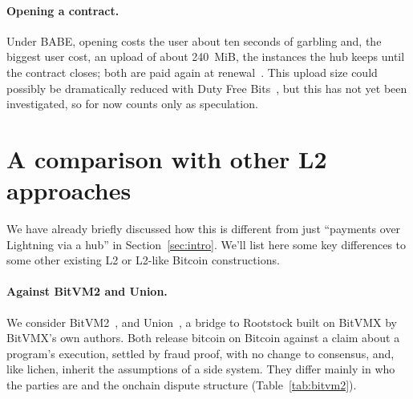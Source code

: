 \documentclass[11pt]{article}
\begin{document}
\paragraph{Opening a contract.} Under BABE, opening costs the user about ten seconds of garbling and, the biggest user cost, an upload of about 240~MiB, the instances the hub keeps until the contract closes; both are paid again at renewal~\cite{lichenl2}. This upload size could possibly be dramatically reduced with Duty Free Bits~\cite{dutyfree}, but this has not yet been investigated, so for now counts only as speculation.

\section{A comparison with other L2 approaches}
\label{sec:positioning}

We have already briefly discussed how this is different from just ``payments over Lightning via a hub'' in Section~\ref{sec:intro}. We'll list here some key differences to some other existing L2 or L2-like Bitcoin constructions.

\paragraph{Against BitVM2 and Union.} We consider BitVM2~\cite{bitvm2usenix}, and
Union~\cite{union}, a bridge to Rootstock built on BitVMX by BitVMX's
own authors. Both release bitcoin on Bitcoin against a claim about
a program's execution, settled by fraud proof, with no change to
consensus, and, like lichen, inherit the assumptions of a side system. They differ mainly in who the parties are and the onchain dispute structure (Table~\ref{tab:bitvm2}).
\end{document}
